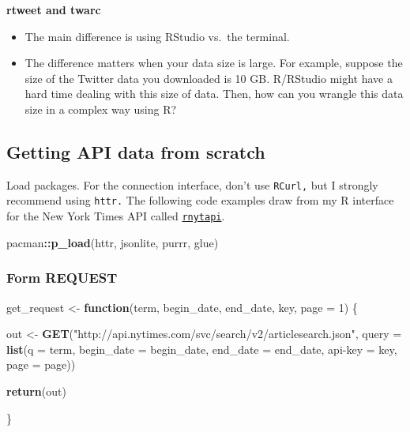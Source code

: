 \documentclass[
]{book}
\newenvironment{Shaded}{\begin{snugshade}}{\end{snugshade}}
\newcommand{\ControlFlowTok}[1]{\textcolor[rgb]{0.13,0.29,0.53}{\textbf{#1}}}
\newcommand{\DataTypeTok}[1]{\textcolor[rgb]{0.13,0.29,0.53}{#1}}
\newcommand{\DecValTok}[1]{\textcolor[rgb]{0.00,0.00,0.81}{#1}}
\newcommand{\KeywordTok}[1]{\textcolor[rgb]{0.13,0.29,0.53}{\textbf{#1}}}
\newcommand{\NormalTok}[1]{#1}
\newcommand{\OperatorTok}[1]{\textcolor[rgb]{0.81,0.36,0.00}{\textbf{#1}}}
\newcommand{\StringTok}[1]{\textcolor[rgb]{0.31,0.60,0.02}{#1}}
\begin{document}
\textbf{rtweet and twarc}

\begin{itemize}
\item
  The main difference is using RStudio vs.~the terminal.
\item
  The difference matters when your data size is large. For example, suppose the size of the Twitter data you downloaded is 10 GB. R/RStudio might have a hard time dealing with this size of data. Then, how can you wrangle this data size in a complex way using R?
\end{itemize}

\hypertarget{getting-api-data-from-scratch}{%
\subsection{Getting API data from scratch}\label{getting-api-data-from-scratch}}

Load packages. For the connection interface, don't use \texttt{RCurl,} but I strongly recommend using \texttt{httr.} The following code examples draw from my R interface for the New York Times API called \href{https://jaeyk.github.io/rnytapi/}{\texttt{rnytapi}}.

\begin{Shaded}
\begin{Highlighting}[]
\NormalTok{pacman}\OperatorTok{::}\KeywordTok{p\_load}\NormalTok{(httr, jsonlite, purrr, glue)}
\end{Highlighting}
\end{Shaded}

\hypertarget{form-request}{%
\subsubsection{Form REQUEST}\label{form-request}}

\begin{Shaded}
\begin{Highlighting}[]
\NormalTok{get\_request \textless{}{-}}\StringTok{ }\ControlFlowTok{function}\NormalTok{(term, begin\_date, end\_date, key, }\DataTypeTok{page =} \DecValTok{1}\NormalTok{) \{}

\NormalTok{    out \textless{}{-}}\StringTok{ }\KeywordTok{GET}\NormalTok{(}\StringTok{"http://api.nytimes.com/svc/search/v2/articlesearch.json"}\NormalTok{,}
        \DataTypeTok{query =} \KeywordTok{list}\NormalTok{(}\StringTok{\textquotesingle{}q\textquotesingle{}}\NormalTok{ =}\StringTok{ }\NormalTok{term,}
                     \StringTok{\textquotesingle{}begin\_date\textquotesingle{}}\NormalTok{ =}\StringTok{ }\NormalTok{begin\_date,}
                     \StringTok{\textquotesingle{}end\_date\textquotesingle{}}\NormalTok{ =}\StringTok{ }\NormalTok{end\_date,}
                     \StringTok{\textquotesingle{}api{-}key\textquotesingle{}}\NormalTok{ =}\StringTok{ }\NormalTok{key,}
                     \StringTok{\textquotesingle{}page\textquotesingle{}}\NormalTok{ =}\StringTok{ }\NormalTok{page))}

    \KeywordTok{return}\NormalTok{(out)}

\NormalTok{\}}
\end{Highlighting}
\end{Shaded}
\end{document}
